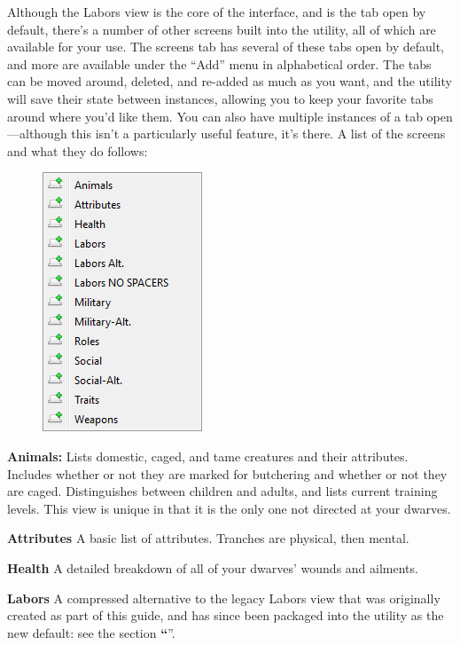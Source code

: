 \documentclass[]{article}
\newcommand{\jump}[1] {\textbf{``\nameref{sec:#1}}''}
\newcommand{\boldlist}[1] {
\vspace{12pt}
\noindent \textbf{#1}
}
\begin{document}
Although the Labors view is the core of the interface, and is the tab open by default, there's a number
of other screens built into the utility, all of which are available for your use. The screens tab has
several of these tabs open by default, and more are available under the ``Add'' menu in alphabetical order.
The tabs can be moved around, deleted, and re-added as much as you want, and the utility will save their
state between instances, allowing you to keep your favorite tabs around where you'd like them. You can
also have multiple instances of a tab open---although this isn't a particularly useful feature, it's
there. A list of the screens and what they do follows:

\begin{figure}
\vspace{-10pt}
  \begin{center}
    \includegraphics{Sec1Fig10}
  \end{center}
\vspace{-70pt}
\end{figure}
\noindent\textbf{Animals:} Lists domestic, caged, and tame creatures and their attributes. Includes
whether or not they are marked for butchering and whether or not they are caged. Distinguishes between
children and adults, and lists current training levels. This view is unique in that it is the only one
not directed at your dwarves.


\boldlist{Attributes} A basic list of attributes. Tranches are physical, then mental.


\boldlist{Health} A detailed breakdown of all of your dwarves' wounds and ailments.


\boldlist{Labors} A compressed alternative to the legacy Labors view that was originally created
as part of this guide, and has since been packaged into the utility as the new default: see the section
\jump{Creating Your Own Grid Views}.
\end{document}

